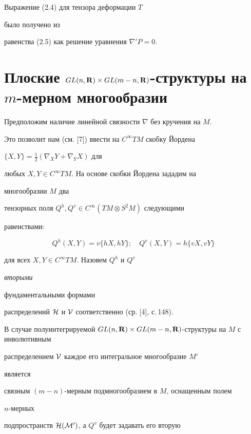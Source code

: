  


\begin{notenonum} Выражение (2.4) для тензора деформации $T$ 


было получено из 


равенства (2.5) как решение уравнения $\nabla'P=0$. 


\end{notenonum} 


 


\section{Плоские $GL(n,\bold R)\times GL(m-n,\bold R)$-структуры на $m$-мерном многообразии} 


 


Предположим наличие линейной связности $\nabla$ без кручения на $M$. 


Это позволит нам (см. [7]) ввести на $C^\infty TM$ скобку Йордена 


$\{X,Y\}=\frac{1}{2}(\nabla_X Y+\nabla_Y X)$ для 


любых $X,Y\in C^\infty TM$. На основе скобки Йордена зададим на 


многообразии $M$ два 


тензорных поля $Q^h,Q^v\in C^\infty(TM\otimes S^2M)$ следующими 


равенствами: 


$$ 


Q^h(X,Y)=v\{hX,hY\};\quad 


Q^v(X,Y)=h\{vX,vY\} 


$$ 


для всех $X,Y\in C^\infty TM$. Назовем $Q^h$ и $Q^v$ {\it вторыми 


фундаментальными формами} 


распределений $\cal H$ и $\cal V$ соответственно (ср. [4], с.\,148). 


 


В случае полуинтегрируемой $GL(n,\bold R)\times GL(m-n,\bold R)$-структуры на $M$ с инволютивным 


распределением $\cal V$ каждое его интегральное многообразие $M'$ 


является 


связным $(m-n)$-мерным подмногообразием в $M$, оснащенным полем 


$n$-мерных 


подпространств $\cal H(M')$, а $Q^v$ будет задавать его вторую 



